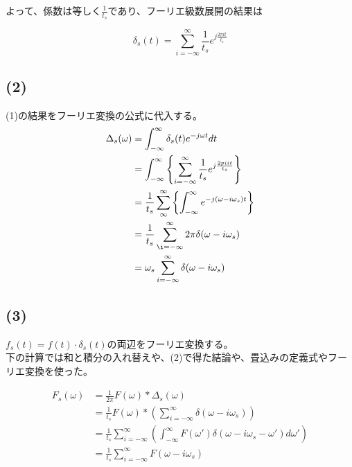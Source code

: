 \documentclass[a4paper,12pt,xelatex,ja=standard]{bxjsarticle}
\begin{document}
よって、係数は等しく$\frac{1}{t_s}$であり、フーリエ級数展開の結果は

\[
  \delta_s(t) = \sum^{\infty}_{i = -\infty}\frac{1}{t_s}e^{j \frac{2 \pi i t}{t_s}}
\]

\subsection*{(2)}
(1)の結果をフーリエ変換の公式に代入する。
\begin{equation*}
  \begin{split}
    \Delta_s(\omega)
      &= \int^{\infty}_{-\infty}\delta_s(t)e^{- j \omega t}dt \\
      &= \int^{\infty}_{-\infty}\left\{\sum^{\infty}_{i = -\infty} \frac{1}{t_s}e^{j \frac{2 pi i t}{t_s}}\right\} \\
      &= \frac{1}{t_s} \sum^{\infty}_{\infty}\left\{\int^{\infty}_{-\infty} e^{-j(\omega - i\omega_s)t}\right\} \\
      &= \frac{1}{t_s} \sum^{\infty}_{\i= -\infty}2\pi \delta(\omega - i \omega_s) \\
      &= \omega_s \sum^{\infty}_{i = -\infty}\delta(\omega - i \omega_s)
  \end{split}
\end{equation*}

\subsection*{(3)}
$f_s(t) = f(t) \cdot \delta_s(t)$の両辺をフーリエ変換する。\\
下の計算では和と積分の入れ替えや、(2)で得た結論や、畳込みの定義式やフーリエ変換を使った。

\begin{equation*}
  \begin{split}
    F_s(\omega)
      &= \frac{1}{2 \pi}F(\omega) * \Delta_s(\omega) \\
      &= \frac{1}{t_s}F(\omega) * \left(\sum^{\infty}_{i = -\infty}\delta(\omega - i \omega_s)\right) \\
      &= \frac{1}{t_s} \sum^{\infty}_{i = - \infty} \left(\int^{\infty}_{-\infty}F(\omega')\delta(\omega - i\omega_s - \omega') d\omega'\right) \\
      &= \frac{1}{t_s} \sum^{\infty}_{i = - \infty} F(\omega - i\omega_s) \\
  \end{split}
\end{equation*}
\end{document}

